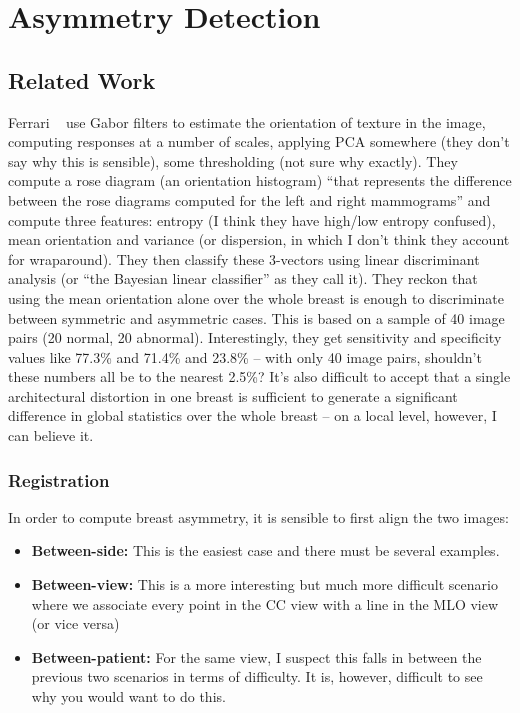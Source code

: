 \chapter{Asymmetry Detection}

\section{Related Work}
Ferrari \etal~\cite{Ferrari_etal_TMI01} use Gabor filters to estimate the orientation of texture in the image, computing responses at a number of scales, applying PCA somewhere (they don't say why this is sensible), some thresholding (not sure why exactly). They compute a rose diagram (an orientation histogram) ``that represents the difference between the rose diagrams
computed for the left and right mammograms'' and compute three features: entropy (I think they have high/low entropy confused), mean orientation and variance (or dispersion, in which I don't think they account for wraparound). They then classify these 3-vectors using linear discriminant analysis (or ``the Bayesian linear classifier'' as they call it). They reckon that using the mean orientation alone over the whole breast is enough to discriminate between symmetric and asymmetric cases. This is based on a sample of 40 image pairs (20 normal, 20 abnormal). Interestingly, they get sensitivity and specificity values like 77.3\% and 71.4\% and 23.8\% -- with only 40 image pairs, shouldn't these numbers all be to the nearest 2.5\%? It's also difficult to accept that a single architectural distortion in one breast is sufficient to generate a significant difference in global statistics over the whole breast -- on a local level, however, I can believe it.


\subsection{Registration}
In order to compute breast asymmetry, it is sensible to first align the two images:

\begin{itemize}
\item \textbf{Between-side:} This is the easiest case and there must be several examples.
\item \textbf{Between-view:} This is a more interesting but much more difficult scenario where we associate every point in the CC view with a line in the MLO view (or vice versa)~\cite{Kita_etal_CVPR98,vanEngeland_Karssemeijer_IWDM06}
\item \textbf{Between-patient:} For the same view, I suspect this falls in between the previous two scenarios in terms of difficulty. It is, however, difficult to see why you would want to do this.
\end{itemize}


